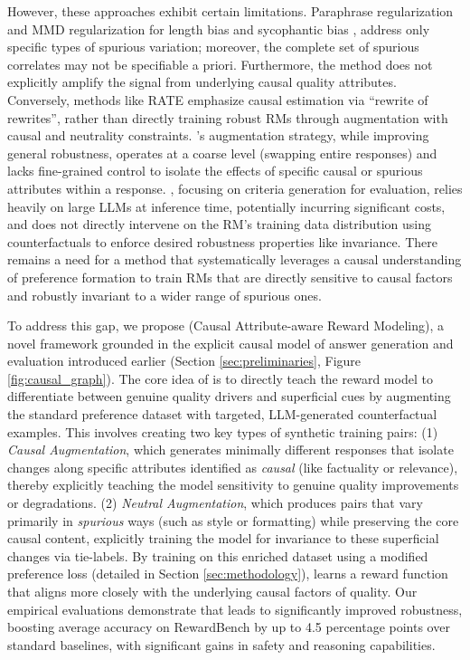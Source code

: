 However, these approaches exhibit certain limitations. Paraphrase regularization \citep{wu2025rewordbench} and MMD regularization for length bias and sycophantic bias \citep{wang2025beyond}, address only specific types of spurious variation; moreover, the complete set of spurious correlates may not be specifiable a priori. Furthermore, the method does not explicitly amplify the signal from underlying causal quality attributes.
Conversely, methods like RATE \citep{reber2024rate} emphasize causal estimation via ``rewrite of rewrites'', rather than directly training robust RMs through augmentation with causal and neutrality constraints.
\rrm's augmentation strategy, while improving general robustness, operates at a coarse level (swapping entire responses) and lacks fine-grained control to isolate the effects of specific causal or spurious attributes within a response. \carmo, focusing on criteria generation for evaluation, relies heavily on large LLMs at inference time, potentially incurring significant costs, and does not directly intervene on the RM's training data distribution using counterfactuals to enforce desired robustness properties like invariance. There remains a need for a method that systematically leverages a causal understanding of preference formation to train RMs that are directly sensitive to causal factors and robustly invariant to a wider range of spurious ones.


To address this gap, we propose \textbf{\carma{}} (Causal Attribute-aware Reward Modeling), a novel framework grounded in the explicit causal model of answer generation and evaluation introduced earlier (Section \ref{sec:preliminaries}, Figure \ref{fig:causal_graph}). The core idea of \carma{} is to directly teach the reward model to differentiate between genuine quality drivers and superficial cues by augmenting the standard preference dataset with targeted, LLM-generated counterfactual examples. This involves creating two key types of synthetic training pairs: (1) \textit{Causal Augmentation}, which generates minimally different responses that isolate changes along specific attributes identified as \textit{causal} (like factuality or relevance), thereby explicitly teaching the model sensitivity to genuine quality improvements or degradations. (2) \textit{Neutral Augmentation}, which produces pairs that vary primarily in \textit{spurious} ways (such as style or formatting) while preserving the core causal content, explicitly training the model for invariance to these superficial changes via tie-labels. By training on this enriched dataset using a modified preference loss (detailed in Section \ref{sec:methodology}), \carma{} learns a reward function that aligns more closely with the underlying causal factors of quality. 
Our empirical evaluations demonstrate that \carma{} leads to significantly improved robustness, boosting average accuracy on RewardBench by up to 4.5 percentage points over standard baselines, with significant gains in safety and reasoning capabilities.

